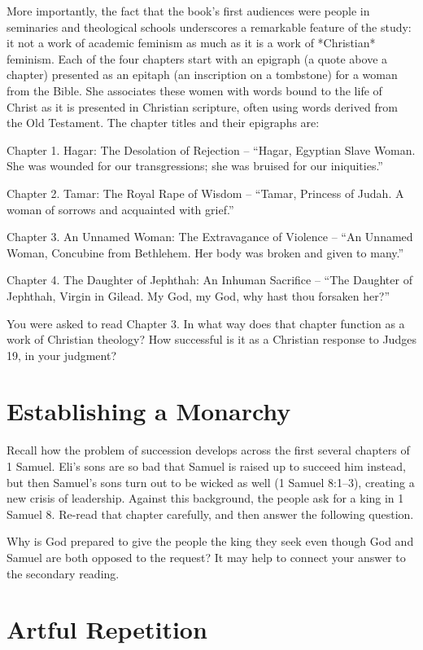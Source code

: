 \documentclass[12pt]{article}
\begin{document}
More importantly, the fact that the book’s first audiences were people in seminaries and theological schools underscores a remarkable feature of the study: it not a work of academic feminism as much as it is a work of *Christian* feminism. Each of the four chapters start with an epigraph (a quote above a chapter) presented as an epitaph (an inscription on a tombstone) for a woman from the Bible. She associates these women with words bound to the life of Christ as it is presented in Christian scripture, often using words derived from the Old Testament. The chapter titles and their epigraphs are:

Chapter 1. Hagar: The Desolation of Rejection – “Hagar, Egyptian Slave Woman. She was wounded for our transgressions; she was bruised for our iniquities.”

Chapter 2. Tamar: The Royal Rape of Wisdom – “Tamar, Princess of Judah. A woman of sorrows and acquainted with grief.”

Chapter 3. An Unnamed Woman: The Extravagance of Violence – “An Unnamed Woman, Concubine from Bethlehem. Her body was broken and given to many.”

Chapter 4. The Daughter of Jephthah: An Inhuman Sacrifice – “The Daughter of Jephthah, Virgin in Gilead. My God, my God, why hast thou forsaken her?”

You were asked to read Chapter 3. In what way does that chapter function as a work of Christian theology? How successful is it as a Christian response to Judges 19, in your judgment?

\section{Establishing a Monarchy}

Recall how the problem of succession develops across the first several chapters of 1 Samuel. Eli’s sons are so bad that Samuel is raised up to succeed him instead, but then Samuel’s sons turn out to be wicked as well (1 Samuel 8:1–3), creating a new crisis of leadership. Against this background, the people ask for a king in 1 Samuel 8. Re-read that chapter carefully, and then answer the following question.

Why is God prepared to give the people the king they seek even though God and Samuel are both opposed to the request? It may help to connect your answer to the secondary reading.

\section{Artful Repetition}
\end{document}
